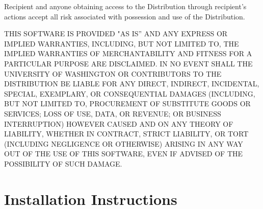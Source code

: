 \documentclass[11pt,oneside]{report} %
\newcommand{\feffcurrent}{\textsc{feff10}}
\newcommand{\program}[1]{\textsc{#1}}
\newcommand{\feff}{\program{feff}}
\begin{document}
\begin{latexonly}
Recipient and anyone obtaining access to the Distribution through
recipient's actions accept all risk associated with possession and
use of the Distribution.

THIS SOFTWARE IS PROVIDED "AS IS'' AND ANY EXPRESS OR IMPLIED
WARRANTIES, INCLUDING, BUT NOT LIMITED TO, THE IMPLIED WARRANTIES OF
MERCHANTABILITY AND FITNESS FOR A PARTICULAR PURPOSE ARE DISCLAIMED.
IN NO EVENT SHALL THE UNIVERSITY OF WASHINGTON OR CONTRIBUTORS TO THE
DISTRIBUTION BE LIABLE FOR ANY DIRECT, INDIRECT, INCIDENTAL, SPECIAL,
EXEMPLARY, OR CONSEQUENTIAL DAMAGES (INCLUDING, BUT NOT LIMITED TO,
PROCUREMENT OF SUBSTITUTE GOODS OR SERVICES; LOSS OF USE, DATA, OR
REVENUE; OR BUSINESS INTERRUPTION) HOWEVER CAUSED AND ON ANY THEORY OF
LIABILITY, WHETHER IN CONTRACT, STRICT LIABILITY, OR TORT (INCLUDING
NEGLIGENCE OR OTHERWISE) ARISING IN ANY WAY OUT OF THE USE OF THIS
SOFTWARE, EVEN IF ADVISED OF THE POSSIBILITY OF SUCH DAMAGE.



\chapter{Installation Instructions}
\label{sec:Append-B-Inst}


  


\end{latexonly}
\end{document}
